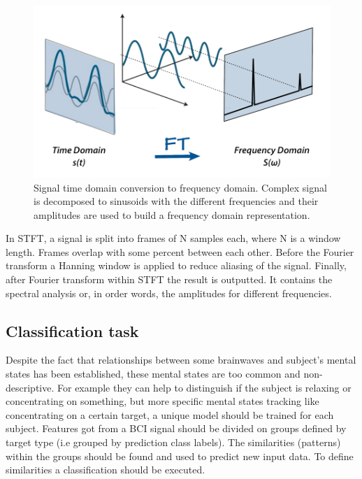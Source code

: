 \documentclass[12pt]{article}
\theoremstyle{definition}
\begin{document}
\begin{figure} [H]
\begin{center}
\includegraphics[width=1\textwidth]{fft}
\caption{Signal time domain conversion to frequency domain. \cite{fft} Complex signal is decomposed to sinusoids with the different frequencies and their amplitudes are used to build a frequency domain representation. }
\end{center}
\end{figure}

In STFT, a signal is split into frames of N samples each, where N is a window length. Frames overlap with some percent between each other. Before the Fourier transform a Hanning window is applied to reduce aliasing of the signal. Finally, after Fourier transform within STFT the result is outputted. It contains the spectral analysis or, in order words, the amplitudes for different frequencies.

\subsection{Classification task}

Despite the fact that relationships between some brainwaves and subject's mental states has been established, these mental states are too common and non-descriptive. For example they can help to distinguish if the subject is relaxing or concentrating on something, but more specific mental states tracking like concentrating on a certain target, a unique model should be trained for each subject. Features got from a BCI signal should be divided on groups defined by target type (i.e grouped by prediction class labels). The similarities (patterns) within the groups should be found and used to predict new input data. To define similarities a classification should be executed.
\end{document}
